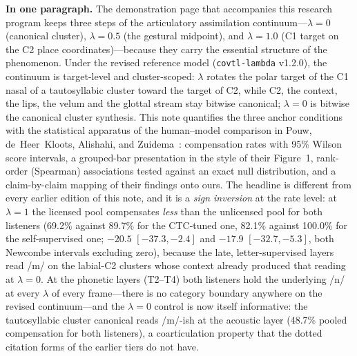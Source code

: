 \documentclass[11pt,a4paper]{article}
\newcommand{\lam}{\lambda}
\begin{document}
\noindent\textbf{In one paragraph.} The demonstration page that
accompanies this research program keeps three steps of the articulatory
assimilation continuum---$\lam=0$ (canonical cluster), $\lam=0.5$
(the gestural midpoint), and $\lam=1.0$ (C1 target on the C2 place
coordinates)---because they carry the essential structure of the
phenomenon. Under the revised reference model (\texttt{covtl-lambda}
v1.2.0), the continuum is target-level and cluster-scoped: $\lam$
rotates the polar target of the C1 nasal of a tautosyllabic cluster
toward the target of C2, while C2, the context, the lips, the velum
and the glottal stream stay bitwise canonical; $\lam=0$ is bitwise
the canonical cluster synthesis. This note quantifies the three
anchor conditions with the statistical apparatus of the human--model
comparison in Pouw, de~Heer~Kloots, Alishahi, and
Zuidema~\citep{pouw2024}: compensation rates with 95\% Wilson score
intervals, a grouped-bar presentation in the style of their
Figure~1, rank-order (Spearman) associations tested against an exact
null distribution, and a claim-by-claim mapping of their findings
onto ours. The headline is different from every earlier edition of
this note, and it is a \emph{sign inversion} at the rate level: at
$\lam=1$ the licensed pool compensates \emph{less} than the
unlicensed pool for both listeners (69.2\% against 89.7\% for the
CTC-tuned one, 82.1\% against 100.0\% for the self-supervised one;
$-20.5$ $[-37.3, -2.4]$ and $-17.9$ $[-32.7, -5.3]$, both Newcombe
intervals excluding zero), because the late, letter-supervised
layers read /m/ on the labial-C2 clusters whose context already
produced that reading at $\lam=0$. At the phonetic layers (T2--T4) both listeners hold the
underlying /n/ at every $\lam$ of every frame---there is no category
boundary anywhere on the revised continuum---and the $\lam=0$
control is now itself informative: the tautosyllabic cluster canonical
reads /m/-ish at the acoustic layer (48.7\% pooled compensation for
both listeners), a coarticulation property that the dotted citation
forms of the earlier tiers do not have.
\end{document}
